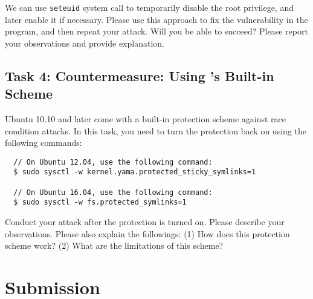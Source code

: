 We can use {\tt seteuid{}} system call to temporarily disable
the root privilege, and later enable it if necessary. Please use 
this approach to fix the vulnerability in the program, and then
repeat your attack. Will you be able to succeed? Please report your
observations and provide explanation.



\subsection{Task 4: Countermeasure: Using \ubuntu's Built-in Scheme}

Ubuntu 10.10 and later come with a built-in protection scheme against race condition
attacks. In this task, you need to turn the protection back on using the
following commands:

\begin{lstlisting}
  // On Ubuntu 12.04, use the following command:
  $ sudo sysctl -w kernel.yama.protected_sticky_symlinks=1

  // On Ubuntu 16.04, use the following command:
  $ sudo sysctl -w fs.protected_symlinks=1
\end{lstlisting}

Conduct your attack after the protection is turned on.  
Please describe your observations. Please also explain
the followings: (1) How does this protection scheme work?
(2) What are the limitations of this scheme?






\section{Submission}

\seedsubmission



